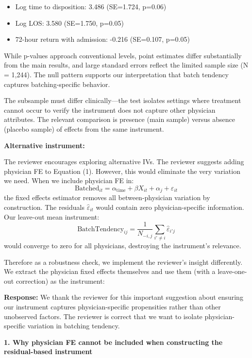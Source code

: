 \documentclass[11pt]{article}
\newcommand{\1}{\hbox{\rm 1\kern-.35em 1}}
\begin{document}
{\begin{itemize}
\item Log time to disposition: 3.486 (SE=1.724, p=0.06)
\item Log LOS: 3.580 (SE=1.750, p=0.05)
\item 72-hour return with admission: -0.216 (SE=0.107, p=0.05)
\end{itemize}

While p-values approach conventional levels, point estimates differ substantially from the main results, and large standard errors reflect the limited sample size (N = 1,244). The null pattern supports our interpretation that batch tendency captures batching-specific behavior.

The subsample must differ clinically—the test isolates settings where treatment cannot occur to verify the instrument does not capture other physician attributes. The relevant comparison is presence (main sample) versus absence (placebo sample) of effects from the same instrument.

\textbf{Alternative instrument:}

The reviewer encourages exploring alternative IVs. The reviewer suggests adding physician FE to Equation (1). However, this would eliminate the very variation we need. When we include physician FE in:
\begin{equation}
\text{Batched}_{it} = \alpha_{\text{time}} + \beta X_{it} + \alpha_j + \varepsilon_{it}
\end{equation}
the fixed effects estimator removes all between-physician variation by construction. The residuals $\hat{\varepsilon}_{it}$ would contain zero physician-specific information. Our leave-out mean instrument:
$$\text{BatchTendency}_{ij} = \frac{1}{N_{-i,j}}\sum_{i' \neq i} \hat{\varepsilon}_{i'j}$$
would converge to zero for all physicians, destroying the instrument's relevance.

Therefore as a robustness check, we implement the reviewer's insight differently. We extract the physician fixed effects themselves and use them (with a leave-one-out correction) as the instrument:


\noindent\textbf{Response:} 
\color{blue}
We thank the reviewer for this important suggestion about ensuring our instrument captures physician-specific propensities rather than other unobserved factors. The reviewer is correct that we want to isolate physician-specific variation in batching tendency.

\bigskip
\noindent\textbf{1. Why physician FE cannot be included when constructing the residual-based instrument}

}
\end{document}
